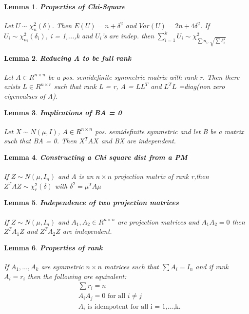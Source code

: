 \documentclass{article}
\newtheorem{lemma}{Lemma}
\begin{document}
\begin{lemma} \textbf{Properties of Chi-Square} \\
\\
Let $U \sim \chi^2_n(\delta)$. Then $E(U)=n+ \delta^2$ and $Var(U)=2n+4\delta^2$.
If $U_i \sim \chi^2_{n_i} (\delta_i)$, i = 1,...,k and $U_i$’s are indep. then $\sum^k_{i=1} U_i \sim \chi^2_{\sum n_i , \sqrt{\sum \delta_i^2}}$
\end{lemma}

\begin{lemma} \textbf{Reducing A to be full rank} \\
\\
Let $A \in R^{n \times n}$ be a pos. semidefinite symmetric matrix with rank r. Then there exists $L \in R^{n \times r}$ such that rank L = r, A = $LL^T$ and $L^TL$ =diag(non zero eigenvalues of A).
 
\end{lemma}

\begin{lemma} \textbf{Implications of BA = 0} \\
\\
Let $X \sim N(\mu,I)$, $A \in R^{n \times n}$ pos. semidefinite symmetric and let B be a matrix such that BA = 0.
Then $X^T AX$ and BX are independent.
\end{lemma}

\begin{lemma} \textbf{Constructing a Chi square dist from a PM} \\
\\
 If $Z \sim N(\mu,I_n)$ and A is an $n \times n $ projection matrix of rank r,then $Z^TAZ\sim \chi^2_r(\delta)$ with $\delta^2 =\mu^TA \mu$
\end{lemma}

\begin{lemma} \textbf{Independence of two projection matrices} \\
\\
  If $Z \sim N( \mu, I_n)$ and $A_1, A_2 \in R^{n \times n}$ are projection matrices and $A_1A_2 = 0$ then $Z^T A_1Z$ and $Z^T A_2Z$ are independent.
\end{lemma}

\begin{lemma} \textbf{Properties of rank}\\
\\
If $A_1,...,A_k$ are symmetric $n \times n$ matrices such that $\sum A_i = I_n$ and if rank $A_i = r_i$
then the following are equivalent:
\begin{align*}
    & \sum r_i =n \\
    &A_iA_j =0 \text{ for all } i \ne j \\
    &A_i \text{ is idempotent for all i = 1,...,k.}\\
\end{align*}
\end{lemma}
\end{document}
